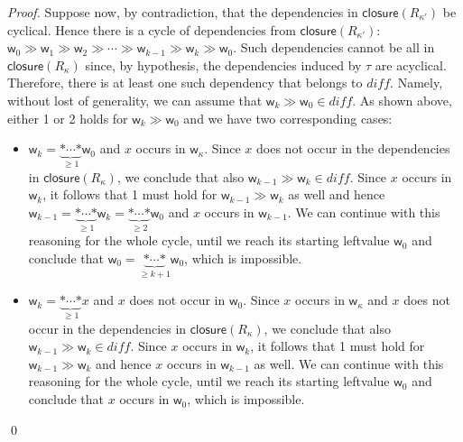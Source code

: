 \begin{proof}
  Suppose now, by contradiction, that the dependencies in
  $\mathsf{closure}(R_{\kappa'})$ be cyclical. Hence there is a cycle of dependencies
  from $\mathsf{closure}(R_{\kappa'})$: $\mathsf{w}_0\gg\mathsf{w}_1\gg\mathsf{w}_2\gg\cdots\gg
  \mathsf{w}_{k-1}\gg\mathsf{w}_k\gg\mathsf{w}_0$. Such dependencies
  cannot be all in $\mathsf{closure}(R_\kappa)$ since, by hypothesis, the dependencies
  induced by $\tau$ are acyclical. Therefore, there is at least one such dependency
  that belongs to $\mathit{diff}$. Namely, without lost of generality, we can assume that
  $\mathsf{w}_k\gg\mathsf{w}_0\in\mathit{diff}$. As shown above, either 1 or 2 holds for
  $\mathsf{w}_k\gg\mathsf{w}_0$ and we have two corresponding cases:
  \begin{itemize}
  \item $\mathsf{w}_k=\underbrace{\mathtt{*}\cdots\mathtt{*}}_{\ge 1}\mathsf{w}_0$
    and $x$ occurs in $\mathsf{w}_\kappa$. Since $x$ does not occur in the dependencies
    in $\mathsf{closure}(R_\kappa)$, we conclude that also
    $\mathsf{w}_{k-1}\gg\mathsf{w}_k\in\mathit{diff}$. Since $x$ occurs in $\mathsf{w}_k$,
    it follows that 1 must hold for $\mathsf{w}_{k-1}\gg\mathsf{w}_k$ as well and hence
    $\mathsf{w}_{k-1}=\underbrace{\mathtt{*}\cdots\mathtt{*}}_{\ge 1}\mathsf{w}_k=
    \underbrace{\mathtt{*}\cdots\mathtt{*}}_{\ge 2}\mathsf{w}_0$ and $x$
    occurs in $\mathsf{w}_{k-1}$. We can continue with this reasoning for the whole cycle, until
    we reach its starting leftvalue $\mathsf{w}_0$ and conclude that
    $\mathsf{w}_0=\underbrace{\mathtt{*}\cdots\mathtt{*}}_{\ge k+1}\mathsf{w}_0$, which is
    impossible.
  \item $\mathsf{w}_k=\underbrace{\mathtt{*}\cdots\mathtt{*}}_{\ge 1}x$ and $x$ does not occur in
    $\mathsf{w}_0$. Since $x$ occurs in $\mathsf{w}_\kappa$
    and $x$ does not occur in the dependencies
    in $\mathsf{closure}(R_\kappa)$, we conclude that also
    $\mathsf{w}_{k-1}\gg\mathsf{w}_k\in\mathit{diff}$.
    Since $x$ occurs in $\mathsf{w}_k$,
    it follows that 1 must hold for $\mathsf{w}_{k-1}\gg\mathsf{w}_k$ and hence
    $x$ occurs in $\mathsf{w}_{k-1}$ as well. We can continue with
    this reasoning for the whole cycle, until
    we reach its starting leftvalue $\mathsf{w}_0$ and conclude that $x$ occurs in $\mathsf{w}_0$,
    which is impossible.
  \end{itemize}
  \qed
\end{proof}

